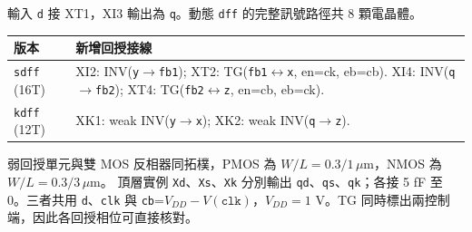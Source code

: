 輸入 \texttt{d} 接 XT1，XI3 輸出為 \texttt{q}。動態 \texttt{dff} 的完整訊號路徑共 8 顆電晶體。
\begin{center}\small\begin{tabular}{p{.24\linewidth}p{.68\linewidth}}\toprule
版本 & 新增回授接線\\\midrule
\texttt{sdff} (16T) & XI2: INV(\texttt{y}\(\to\)\texttt{fb1}); XT2: TG(\texttt{fb1}\(\leftrightarrow\)\texttt{x}, en=ck, eb=cb). XI4: INV(\texttt{q}\(\to\)\texttt{fb2}); XT4: TG(\texttt{fb2}\(\leftrightarrow\)\texttt{z}, en=cb, eb=ck).\\
\texttt{kdff} (12T) & XK1: weak INV(\texttt{y}\(\to\)\texttt{x}); XK2: weak INV(\texttt{q}\(\to\)\texttt{z}).\\
\bottomrule\end{tabular}\end{center}
弱回授單元與雙 MOS 反相器同拓樸，PMOS 為 \(W/L=0.3/1\,\mu\mathrm m\)，NMOS 為 \(W/L=0.3/3\,\mu\mathrm m\)。
頂層實例 \texttt{Xd}、\texttt{Xs}、\texttt{Xk} 分別輸出 \texttt{qd}、\texttt{qs}、\texttt{qk}；各接 5 fF 至 0。三者共用 \texttt{d}、\texttt{clk} 與 \texttt{cb}=\(V_{DD}-V(\texttt{clk})\)，\(V_{DD}=1\) V。TG 同時標出兩控制端，因此各回授相位可直接核對。
\endgroup

